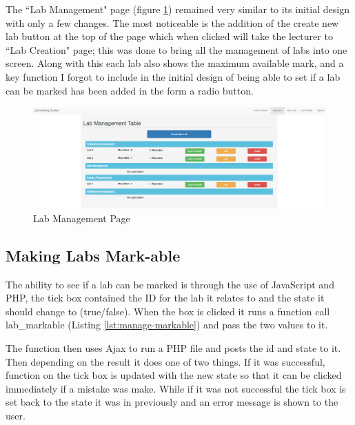 \documentclass[11pt]{report}
\begin{document}
The ``Lab Management" page (figure \ref{fig:lab-management}) remained very similar to its initial design with only a few changes. The most noticeable is the addition of the create new lab button at the top of the page which when clicked will take the lecturer to ``Lab Creation" page; this was done to bring all the management of labs into one screen. Along with this each lab also shows the maximum available mark, and a key function I forgot to include in the initial design of being able to set if a lab can be marked has been added in the form a radio button.

\begin{figure}[H]
    \centering
    \includegraphics[width=1\textwidth]{images/implementation/lab-management-page.png}
    \caption{Lab Management Page}
    \label{fig:lab-management}
\end{figure}


\subsection{Making Labs Mark-able}

The ability to see if a lab can be marked is through the use of JavaScript and PHP, the tick box contained the ID for the lab it relates to and the state it should change to (true/false). When the box is clicked it runs a function call lab\_markable (Listing \ref{lst:manage-markable}) and pass the two values to it. 

The function then uses Ajax to run a PHP file and posts the id and state to it.  Then depending on the result it does one of two things. If it was successful, function on the tick box is updated with the new state so that it can be clicked immediately if a mistake was make. While if it was not successful the tick box is set back to the state it was in previously and an error message is shown to the user. 
\end{document}

